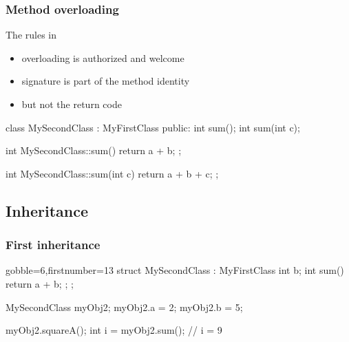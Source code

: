 \begin{frame}[fragile]
  \frametitle{Method overloading}
  \begin{block}{The rules in \cpp}
    \begin{itemize}
    \item overloading is authorized and welcome
    \item signature is part of the method identity
    \item but not the return code
    \end{itemize}
  \end{block}
  \begin{cppcode*}{}
    class MySecondClass : MyFirstClass {
    public:
      int sum();
      int sum(int c);
    }

    int MySecondClass::sum() { return a + b; };

    int MySecondClass::sum(int c) { return a + b + c; };
  \end{cppcode*}
\end{frame}

\subsection{Inheritance}

\begin{frame}[fragile]
  \frametitle{First inheritance}
  \begin{multicols}{2}
    \begin{cppcode*}{gobble=6,firstnumber=13}
      struct MySecondClass :
        MyFirstClass {
        int b;
        int sum() {
          return a + b;
        };
      };

      MySecondClass myObj2;
      myObj2.a = 2;
      myObj2.b = 5;

      myObj2.squareA();
      int i = myObj2.sum();
      // i = 9
    \end{cppcode*}
    \columnbreak
    \null \vfill
    \vfill \null
  \end{multicols}
\end{frame}


